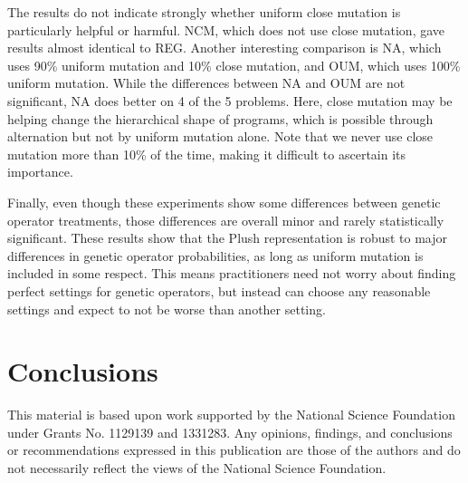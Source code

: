 The results do not indicate strongly whether uniform close mutation is particularly helpful or harmful. NCM, which does not use close mutation, gave results almost identical to REG. Another interesting comparison is NA, which uses 90\% uniform mutation and 10\% close mutation, and OUM, which uses 100\% uniform mutation. While the differences between NA and OUM are not significant, NA does better on 4 of the 5 problems. Here, close mutation may be helping change the hierarchical shape of programs, which is possible through alternation but not by uniform mutation alone. Note that we never use close mutation more than 10\% of the time, making it difficult to ascertain its importance.

Finally, even though these experiments show some differences between genetic operator treatments, those differences are overall minor and rarely statistically significant. These results show that the Plush representation is robust to major differences in genetic operator probabilities, as long as uniform mutation is included in some respect. This means practitioners need not worry about finding perfect settings for genetic operators, but instead can choose any reasonable settings and expect to not be worse than another setting.


\section{Conclusions}








\begin{acknowledgement}
This material is based upon work supported by the National Science Foundation under Grants No. 1129139 and 1331283. Any opinions, findings, and conclusions or recommendations expressed in this publication are those of the authors and do not necessarily reflect the views of the National Science Foundation.
\end{acknowledgement}
%




